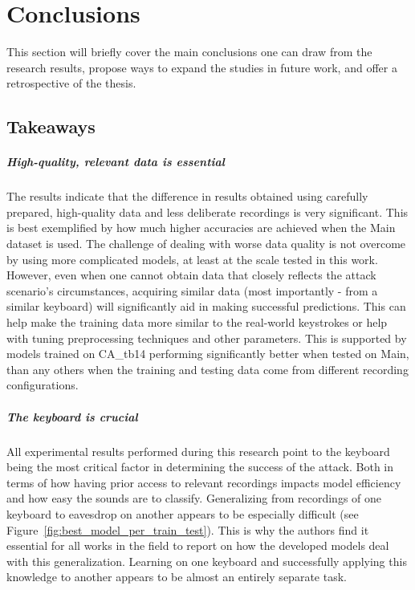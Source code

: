 \documentclass[../main.tex]{subfiles}
\begin{document}
\chapter{Conclusions}\label{cha:conclusions}

This section will briefly cover the main conclusions one can draw from the research results, propose ways to expand the studies in future work, and offer a retrospective of the thesis.  

\section{Takeaways}

\paragraph{High-quality, relevant data is essential}
The results indicate that the difference in results obtained using carefully prepared, high-quality data and less deliberate recordings is very significant. This is best exemplified by how much higher accuracies are achieved when the Main dataset is used. The challenge of dealing with worse data quality is not overcome by using more complicated models, at least at the scale tested in this work.
However, even when one cannot obtain data that closely reflects the attack scenario's circumstances, acquiring similar data (most importantly - from a similar keyboard) will significantly aid in making successful predictions.
This can help make the training data more similar to the real-world keystrokes or help with tuning preprocessing techniques and other parameters. This is supported by models trained on CA\_tb14 performing significantly better when tested on Main, than any others when the training and testing data come from different recording configurations.


\paragraph{The keyboard is crucial}
All experimental results performed during this research point to the keyboard being the most critical factor in determining the success of the attack. Both in terms of how having prior access to relevant recordings impacts model efficiency and how easy the sounds are to classify.
Generalizing from recordings of one keyboard to eavesdrop on another appears to be especially difficult (see Figure~\ref{fig:best_model_per_train_test}). 
This is why the authors find it essential for all works in the field to report on how the developed models deal with this generalization. Learning on one keyboard and successfully applying this knowledge to another appears to be almost an entirely separate task.
\end{document}
